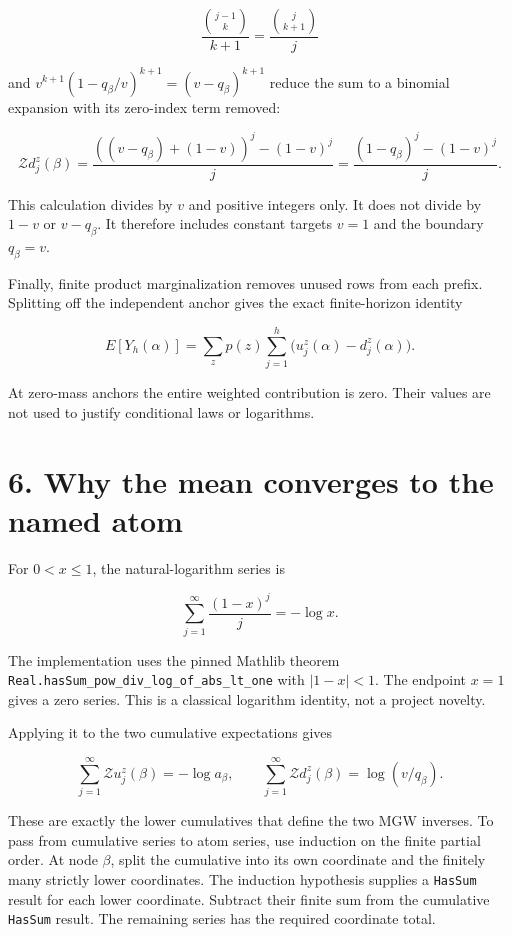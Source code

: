 \[
\frac{\binom{j-1}{k}}{k+1}=\frac{\binom{j}{k+1}}{j}
\]

and \(v^{k+1}(1-q_\beta/v)^{k+1}=(v-q_\beta)^{k+1}\) reduce the sum to a binomial expansion with its zero-index term removed:

\[
\mathcal Zd_j^z(\beta)
=\frac{((v-q_\beta)+(1-v))^j-(1-v)^j}{j}
=\frac{(1-q_\beta)^j-(1-v)^j}{j}.
\]

This calculation divides by \(v\) and positive integers only. It does not divide by \(1-v\) or \(v-q_\beta\). It therefore includes constant targets \(v=1\) and the boundary \(q_\beta=v\).

Finally, finite product marginalization removes unused rows from each prefix. Splitting off the independent anchor gives the exact finite-horizon identity

\[
E[Y_h(\alpha)]
=\sum_zp(z)\sum_{j=1}^h\bigl(u_j^z(\alpha)-d_j^z(\alpha)\bigr).
\]

At zero-mass anchors the entire weighted contribution is zero. Their values are not used to justify conditional laws or logarithms.

\section{6. Why the mean converges to the named atom}\label{why-the-mean-converges-to-the-named-atom}

For \(0<x\le1\), the natural-logarithm series is

\[
\sum_{j=1}^{\infty}\frac{(1-x)^j}{j}=-\log x.
\]

The implementation uses the pinned Mathlib theorem \texttt{Real.hasSum\_pow\_div\_log\_of\_abs\_lt\_one} with \(|1-x|<1\). The endpoint \(x=1\) gives a zero series. This is a classical logarithm identity, not a project novelty.

Applying it to the two cumulative expectations gives

\[
\sum_{j=1}^{\infty}\mathcal Zu_j^z(\beta)=-\log a_\beta,
\qquad
\sum_{j=1}^{\infty}\mathcal Zd_j^z(\beta)=\log(v/q_\beta).
\]

These are exactly the lower cumulatives that define the two MGW inverses. To pass from cumulative series to atom series, use induction on the finite partial order. At node \(\beta\), split the cumulative into its own coordinate and the finitely many strictly lower coordinates. The induction hypothesis supplies a \texttt{HasSum} result for each lower coordinate. Subtract their finite sum from the cumulative \texttt{HasSum} result. The remaining series has the required coordinate total.

